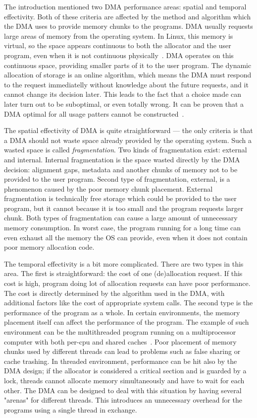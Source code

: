 \documentclass{eeict}
\begin{document}
The introduction mentioned two DMA performance areas: spatial and temporal effectivity. Both of these criteria are affected by the method and algorithm which the DMA uses to provide memory chunks to the programs. DMA usually requests large areas of memory from the operating system. In Linux, this memory is virtual, so the space appears continuous to both the allocator and the user program, even when it is not continuous physically~\cite{drepper}. DMA operates on this continuous space, providing smaller parts of it to the user program. The dynamic allocation of storage is an online algorithm, which means the DMA must respond to the request immediatelly without knowledge about the future requests, and it cannot change its decision later. This leads to the fact that a choice made can later turn out to be suboptimal, or even totally wrong. It can be proven that a DMA optimal for all usage patters cannot be constructed~\cite{dsa}.

The spatial effectivity of DMA is quite straightforward --- the only criteria is that a DMA should not waste space already provided by the operating system. Such a wasted space is called {\em fragmentation}. Two kinds of fragmentation exist: external and internal. Internal fragmentation is the space wasted directly by the DMA decision: alignment gaps, metadata and another chunks of memory not to be provided to the user program. Second type of fragmentation, external, is a phenomenon caused by the poor memory chunk placement. External fragmentation is technically free storage which could be provided to the user program, but it cannot because it is too small and the program requests larger chunk. Both types of fragmentation can cause a large amount of unnecessary memory consumption. In worst case, the program running for a long time can even exhaust all the memory the OS can provide, even when it does not contain poor memory allocation code.

The temporal effectivity is a bit more complicated. There are two types in this area. The first is straightforward: the cost of one (de)allocation request. If this cost is high, program doing lot of allocation requests can have poor performance. The cost is directly determined by the algorithm used in the DMA, with additional factors like the cost of appropriate system calls. The second type is the performance of the program as a whole. In certain environments, the memory placement itself can affect the performance of the program. The example of such environment can be the multithreaded program running on a multiprocessor computer with both per-cpu and shared caches~\cite{drepper}. Poor placement of memory chunks used by different threads can lead to problems such as false sharing or cache trashing. In threaded environment, performance can be hit also by the DMA design; if the allocator is considered a critical section and is guarded by a lock, threads cannot allocate memory simultaneously and have to wait for each other. The DMA can be designed to deal with this situation by having several "arenas" for different threads. This introduces an unnecessary overhead for the programs using a single thread in exchange.
\end{document}
